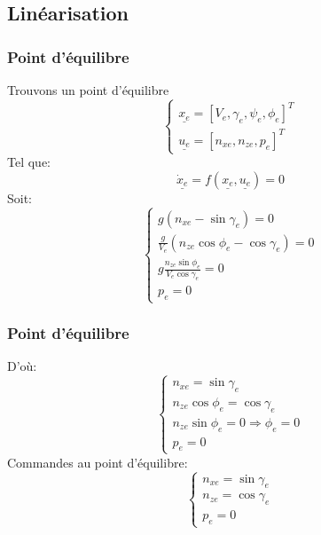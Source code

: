 \documentclass[footheight=2em]{beamer}
\begin{document}
\subsection{Linéarisation}
\begin{frame}
    \frametitle{Point d'équilibre}\pause{}
    Trouvons un point d'équilibre
    \[
    \left \{
    \begin{array}{l}
        \underline{x_e} = {[V_e, \gamma_e, \psi_e, \phi_e]}^{T}\\
        \underline{u_e} = {[n_{xe}, n_{ze}, p_e]}^{T}
    \end{array}
    \right.
    \]
    Tel que:
    \[
    \underline{\dot{x}_e} = f(\underline{x_e}, \underline{u_e}) = 0
    \]\pause{}
    Soit:
    \[
    \left \{
    \begin{array}{l}
        g(n_{xe} - \sin \gamma_e) = 0\\
        \frac{g}{V_e}(n_{ze} \cos \phi_e - \cos \gamma_e) = 0\\
        g \frac{n_{ze} \sin \phi_e}{V_e \cos \gamma_e} = 0\\
        p_e = 0
    \end{array}
    \right.
    \]
\end{frame}

\begin{frame}
    \frametitle{Point d'équilibre}\pause{}
    D'où:
    \[
    \left \{
    \begin{array}{l}
        n_{xe} = \sin \gamma_e \\
        n_{ze} \cos \phi_e = \cos \gamma_e \\
        n_{ze} \sin \phi_e = 0 \Longrightarrow \phi_e = 0 \\
        p_e = 0
    \end{array}
    \right.
    \]\pause{}
    Commandes au point d'équilibre:
    \[\boxed
    {
        \left \{
        \begin{array}{l}
            n_{xe} = \sin \gamma_e \\
            n_{ze} = \cos \gamma_e \\
            p_e = 0
        \end{array}
        \right.
    }
    \]
\end{frame}
\end{document}
